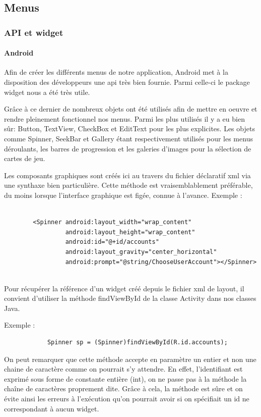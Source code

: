 \subsection{Menus}
	\subsubsection{API et widget}
	\paragraph{Android\\}
		Afin de créer les différents menus de notre application, Android met à la
		disposition des développeurs une \gls{api} très bien fournie. Parmi celle-ci le package \gls{widget}
		nous a été très utile. 
		
		Grâce à ce dernier de nombreux objets ont été utilisés
		afin de mettre en oeuvre et rendre pleinement fonctionnel nos menus.
		Parmi les plus utilisés il y a eu bien sûr: Button, TextView, CheckBox et
		EditText pour les plus explicites. Les objets comme Spinner, SeekBar et
		Gallery étant respectivement utilisés pour les menus déroulants, les barres de
		progression et les galeries d'images pour la sélection de cartes de jeu.
		
		Les composants graphiques sont créés ici au travers du fichier déclaratif
		\gls{xml} via une synthaxe bien particulière. Cette méthode est vraisemblablement
		préférable, du moins lorsque l’interface graphique est figée, connue à l’avance. 
		Exemple :
		\begin{verbatim}
		
		<Spinner android:layout_width="wrap_content"
				 android:layout_height="wrap_content"
				 android:id="@+id/accounts"
				 android:layout_gravity="center_horizontal"
				 android:prompt="@string/ChooseUserAccount"></Spinner>
				
		\end{verbatim}		
		
		
		Pour récupérer la référence d’un widget créé depuis le
		fichier \gls{xml} de layout, il convient d’utiliser la méthode findViewById de la
		classe Activity dans nos classes Java.
		
		
		Exemple :
		
		\begin{verbatim}
			Spinner sp = (Spinner)findViewById(R.id.accounts);
		\end{verbatim}
		
		On peut remarquer que cette méthode accepte en paramètre un entier et non une
		chaine de caractère  comme on pourrait s’y attendre. En effet, l’identifiant est exprimé sous forme de constante entière (int), on
		ne passe pas à la méthode la chaîne de caractères proprement dite. Grâce à cela, la
		méthode est sûre et on évite ainsi les erreurs à l’exécution qu’on pourrait avoir si on
		spécifiait un id ne correspondant à aucun widget.
		
